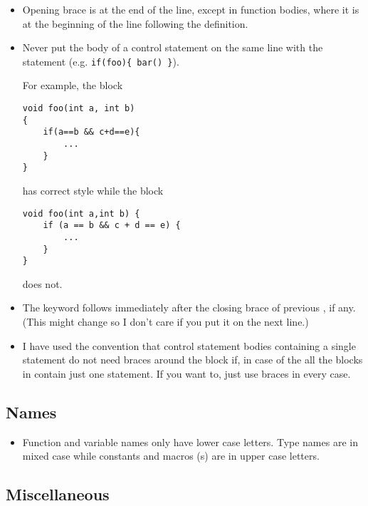 \begin{itemize}
\item Opening brace is at the end of the line, except in function
    bodies, where it is at the beginning of the line following
    the definition.

\item Never put the body of a control statement on the same line
    with the statement (e.g. \verb!if(foo){ bar() }!).

For example, the block
\begin{verbatim}    
void foo(int a, int b)
{
    if(a==b && c+d==e){
        ...
    }
}
\end{verbatim}

has correct style while the block

\begin{verbatim}   
void foo(int a,int b) {
    if (a == b && c + d == e) {
        ...
    }
}
\end{verbatim}

does not.

  \item The  keyword follows immediately after the closing brace of
    previous , if any. (This might change so I don't care if you put
    it on the next line.)
    
  \item I have used the convention that control statement bodies containing
    a single statement do not need braces around the block if, in case of
    the  all the blocks in  
    contain just one statement. If you want to, just use braces in every 
    case.
\end{itemize}

\subsection{Names}

\begin{itemize}
  \item Function and variable names only have lower case letters. Type
    names are in mixed case while constants and macros (s)
    are in upper case letters.
\end{itemize}

\subsection{Miscellaneous}

